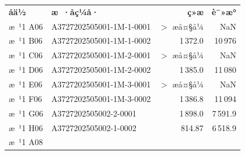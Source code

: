 \documentclass[UTF8,10pt,a4paper,fontset=fandol]{ctexart}
\newcommand{\fieldvalue}[1]{#1}
\begin{document}
\begin{tabularx}{\textwidth}{@{}lXrr@{}}
\textbf{å­ä½} & \textbf{æ ·åç¼å·} & \textbf{ç»æ} & \textbf{è¯»æ°}\\
æ ¹1 A06 &
\fieldvalue{A3727202505001-1M-1-0001} &
\fieldvalue{$>$ æå¤§å¼} &
\fieldvalue{NaN}\\
æ ¹1 B06 &
\fieldvalue{A3727202505001-1M-1-0002} &
\fieldvalue{1\,372.0} &
\fieldvalue{10\,976}\\
æ ¹1 C06 &
\fieldvalue{A3727202505001-1M-2-0001} &
\fieldvalue{$>$ æå¤§å¼} &
\fieldvalue{NaN}\\
æ ¹1 D06 &
\fieldvalue{A3727202505001-1M-2-0002} &
\fieldvalue{1\,385.0} &
\fieldvalue{11\,080}\\
æ ¹1 E06 &
\fieldvalue{A3727202505001-1M-3-0001} &
\fieldvalue{$>$ æå¤§å¼} &
\fieldvalue{NaN}\\
æ ¹1 F06 &
\fieldvalue{A3727202505001-1M-3-0002} &
\fieldvalue{1\,386.8} &
\fieldvalue{11\,094}\\
æ ¹1 G06 &
\fieldvalue{A3727202505002-2-0001} &
\fieldvalue{1\,898.0} &
\fieldvalue{7\,591.9}\\
æ ¹1 H06 &
\fieldvalue{A3727202505002-1-0002} &
\fieldvalue{814.87} &
\fieldvalue{6\,518.9}\\
æ ¹1 A08 &

\end{tabularx}
\end{document}
